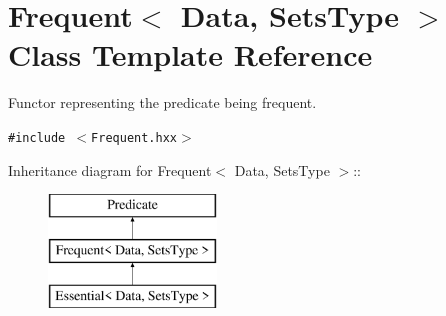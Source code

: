 \section{Frequent$<$ Data, Sets\-Type $>$ Class Template Reference}
\label{class_frequent}
Functor representing the predicate being frequent.  


{\tt \#include $<$Frequent.hxx$>$}

Inheritance diagram for Frequent$<$ Data, Sets\-Type $>$::\begin{figure}[H]
\begin{center}
\leavevmode
\includegraphics[height=3cm]{class_frequent}
\end{center}
\end{figure}

